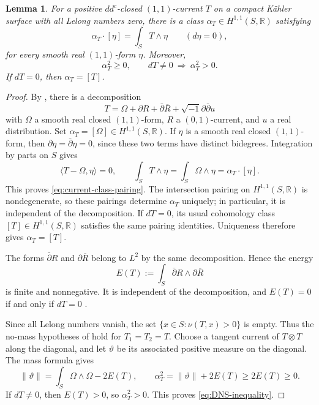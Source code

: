 \documentclass[11pt]{amsart}
\newtheorem{lemma}[theorem]{Lemma}
\theoremstyle{definition}
\theoremstyle{remark}
\numberwithin{equation}{section}
\newcommand{\R}{\mathbb R}
\newcommand{\ddc}{dd^c}
\newcommand{\barp}{\bar\partial}
\begin{document}
\begin{lemma}\label{lem:surface-current-inequality}
For a positive $\ddc$-closed $(1,1)$-current $T$ on a compact
K\"ahler surface with all Lelong numbers zero, there is a class
$\alpha_T\in H^{1,1}(S,\R)$ satisfying
\begin{equation}\label{eq:current-class-pairing}
 \alpha_T\cdot[\eta]=\int_S T\wedge\eta
 \qquad(d\eta=0),
\end{equation}
for every smooth real $(1,1)$-form $\eta$. Moreover,
\begin{equation}\label{eq:DNS-inequality}
 \alpha_T^2\ge0,\qquad dT\ne0\ \Longrightarrow\ \alpha_T^2>0.
\end{equation}
If $dT=0$, then $\alpha_T=[T]$.
\end{lemma}
\begin{proof}
By \cite[Lemma~B.2]{DNS22}, there is a decomposition
\[
 T=\Omega+\partial R+\barp\overline R
                  +\sqrt{-1}\partial\barp u
\]
with $\Omega$ a smooth real closed $(1,1)$-form, $R$ a
$(0,1)$-current, and $u$ a real distribution. Set
$\alpha_T=[\Omega]\in H^{1,1}(S,\R)$.
If $\eta$ is a smooth real closed $(1,1)$-form, then
$\partial\eta=\barp\eta=0$, since these two terms have
distinct bidegrees. Integration by parts on $S$ gives
\[
 \langle T-\Omega,\eta\rangle=0,
 \qquad
 \int_S T\wedge\eta
 =\int_S\Omega\wedge\eta
 =\alpha_T\cdot[\eta].
\]
This proves \eqref{eq:current-class-pairing}. The intersection
pairing on $H^{1,1}(S,\R)$ is nondegenerate, so these pairings
determine $\alpha_T$ uniquely; in particular, it is independent
of the decomposition. If $dT=0$, its usual cohomology class
$[T]\in H^{1,1}(S,\R)$ satisfies the same pairing identities.
Uniqueness therefore gives $\alpha_T=[T]$.

The forms $\barp R$ and $\partial\overline R$ belong to $L^2$
by the same decomposition. Hence the energy
\[
 E(T):=\int_S\barp R\wedge\partial\overline R
\]
is finite and nonnegative. It is independent of the decomposition,
and $E(T)=0$ if and only if $dT=0$
\cite[Appendix~B, (B.4) and the subsequent discussion]{DNS22}.

Since all Lelong numbers vanish, the set
$\{x\in S:\nu(T,x)>0\}$ is empty. Thus the no-mass hypotheses
of \cite[Theorem~2.2]{DNS22} hold for $T_1=T_2=T$.
Choose a tangent current of $T\otimes T$ along the diagonal,
and let $\vartheta$ be its associated positive measure on the
diagonal. The mass formula \cite[Theorem~2.2(2), (2.3)]{DNS22}
gives
\[
 \|\vartheta\|=\int_S\Omega\wedge\Omega-2E(T),
 \qquad
 \alpha_T^2=\|\vartheta\|+2E(T)\ge2E(T)\ge0.
\]
If $dT\ne0$, then $E(T)>0$, so $\alpha_T^2>0$.
This proves \eqref{eq:DNS-inequality}.
\end{proof}
\end{document}
